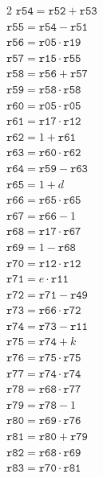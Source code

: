\documentclass[10pt]{article}
\begin{document}
\begin{multicols}{2}
\(\mathtt{r54} = \mathtt{r52} + \mathtt{r53}\)\\
\(\mathtt{r55} = \mathtt{r54} - \mathtt{r51}\)\\
\(\mathtt{r56} = \mathtt{r05} \cdot \mathtt{r19}\)\\
\(\mathtt{r57} = \mathtt{r15} \cdot \mathtt{r55}\)\\
\(\mathtt{r58} = \mathtt{r56} + \mathtt{r57}\)\\
\(\mathtt{r59} = \mathtt{r58} \cdot \mathtt{r58}\)\\
\(\mathtt{r60} = \mathtt{r05} \cdot \mathtt{r05}\)\\
\(\mathtt{r61} = \mathtt{r17} \cdot \mathtt{r12}\)\\
\(\mathtt{r62} = 1 + \mathtt{r61}\)\\
\(\mathtt{r63} = \mathtt{r60} \cdot \mathtt{r62}\)\\
\(\mathtt{r64} = \mathtt{r59} - \mathtt{r63}\)\\
\(\mathtt{r65} = 1 + d\)\\
\(\mathtt{r66} = \mathtt{r65} \cdot \mathtt{r65}\)\\
\(\mathtt{r67} = \mathtt{r66} - 1\)\\
\(\mathtt{r68} = \mathtt{r17} \cdot \mathtt{r67}\)\\
\(\mathtt{r69} = 1 - \mathtt{r68}\)\\
\(\mathtt{r70} = \mathtt{r12} \cdot \mathtt{r12}\)\\
\(\mathtt{r71} = e \cdot \mathtt{r11}\)\\
\(\mathtt{r72} = \mathtt{r71} - \mathtt{r49}\)\\
\(\mathtt{r73} = \mathtt{r66} \cdot \mathtt{r72}\)\\
\(\mathtt{r74} = \mathtt{r73} - \mathtt{r11}\)\\
\(\mathtt{r75} = \mathtt{r74} + k\)\\
\(\mathtt{r76} = \mathtt{r75} \cdot \mathtt{r75}\)\\
\(\mathtt{r77} = \mathtt{r74} \cdot \mathtt{r74}\)\\
\(\mathtt{r78} = \mathtt{r68} \cdot \mathtt{r77}\)\\
\(\mathtt{r79} = \mathtt{r78} - 1\)\\
\(\mathtt{r80} = \mathtt{r69} \cdot \mathtt{r76}\)\\
\(\mathtt{r81} = \mathtt{r80} + \mathtt{r79}\)\\
\(\mathtt{r82} = \mathtt{r68} \cdot \mathtt{r69}\)\\
\(\mathtt{r83} = \mathtt{r70} \cdot \mathtt{r81}\)\\

\end{multicols}
\end{document}
